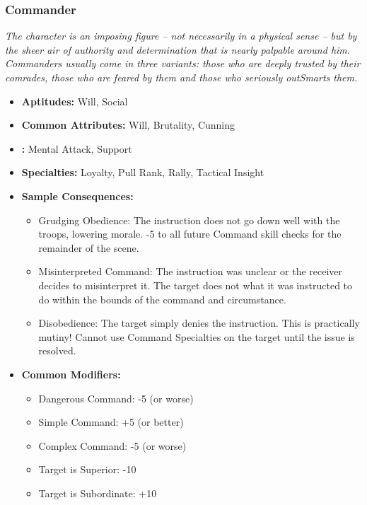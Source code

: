 	\subsubsection{Commander}\label{Commander}
		\textit{The character is an imposing figure – not necessarily in a physical sense – but by the sheer air of authority and determination that is nearly palpable around him.
		Commanders usually come in three variants: those who are deeply trusted by their comrades, those who are feared by them and those who seriously outSmarts them.}
		\begin{itemize}
			\item \textbf{Aptitudes:} Will, Social
			\item \textbf{Common Attributes:} Will, Brutality, Cunning
			\item \textbf{:} Mental Attack, Support
			\item \textbf{Specialties:} Loyalty, Pull Rank, Rally, Tactical Insight
			\item \textbf{Sample Consequences:} 
			\begin{itemize}
				\item Grudging Obedience: The instruction does not go down well with the troops, lowering morale. -5 to all future Command skill checks for the remainder of the scene.
				\item Misinterpreted Command: The instruction was unclear or the receiver decides to misinterpret it. The target does not what it was instructed to do within the bounds of the command and circumstance.
				\item Disobedience: The target simply denies the instruction. This is practically mutiny! Cannot use Command Specialties on the target until the issue is resolved.
			\end{itemize}
			\item \textbf{Common Modifiers:}
			\begin{itemize}
				\item Dangerous Command: -5 (or worse)
				\item Simple Command: +5 (or better)
				\item Complex Command: -5 (or worse)
				\item Target is Superior: -10
				\item Target is Subordinate: +10
			\end{itemize}
		\end{itemize}

